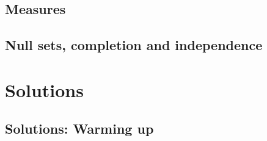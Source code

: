\documentclass{easyclass}
\begin{document}
\chapter{Measures}



\chapter{Null sets, completion and independence}




% 


% 


\part{Solutions}

\chapter{Solutions: Warming up}


\end{document}
